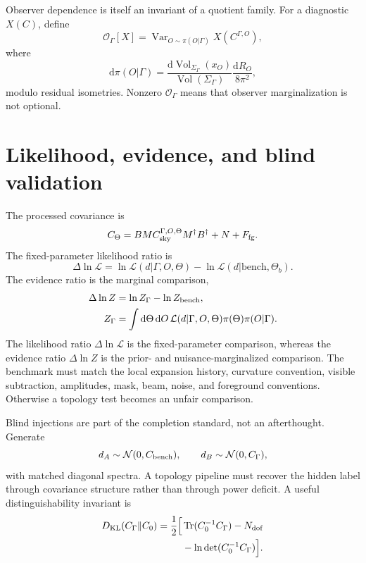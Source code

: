 \documentclass[
  aps,
  prd,
  reprint,
  superscriptaddress,
  floatfix,
  nofootinbib,
  longbibliography
]{revtex4-2}
\theoremstyle{plain}
\theoremstyle{definition}
\theoremstyle{remark}
\newcommand{\dd}{\mathrm d}
\newcommand{\Vol}{\operatorname{Vol}}
\newcommand{\Tr}{\operatorname{Tr}}
\newcommand{\KL}{\operatorname{KL}}
\newcommand{\Ocal}{\mathcal O}
\newcommand{\Lcal}{\mathcal L}
\begin{document}
Observer dependence is itself an invariant of a quotient family.  For a diagnostic $X(C)$, define
\begin{equation}
\Ocal_\Gamma[X]=\operatorname{Var}_{O\sim\pi(O|\Gamma)}X(C^{\Gamma,O}),
\label{eq:observer_dependence}
\end{equation}
where
\begin{equation}
\dd\pi(O|\Gamma)=
\frac{\dd\Vol_{\Sigma_\Gamma}(x_O)}{\Vol(\Sigma_\Gamma)}
\frac{\dd R_O}{8\pi^2},
\end{equation}
modulo residual isometries.  Nonzero $\Ocal_\Gamma$ means that observer marginalization is not optional.

\section{Likelihood, evidence, and blind validation}

The processed covariance is
\begin{equation}
C_\Theta=BMC_{\rm sky}^{\Gamma,O,\Theta}M^\dagger B^\dagger+N+F_{\rm fg}.
\label{eq:processed_covariance}
\end{equation}
The fixed-parameter likelihood ratio is
\begin{equation}
\Delta\ln\Lcal=
\ln\Lcal(d|\Gamma,O,\Theta)-\ln\Lcal(d|\mathrm{bench},\Theta_b).
\label{eq:likelihood_ratio}
\end{equation}
The evidence ratio is the marginal comparison,
\begin{align}
\Delta\ln Z&=\ln Z_\Gamma-\ln Z_{\rm bench},\nonumber\\
Z_\Gamma&=\int\dd\Theta\,\dd O\,
\Lcal(d|\Gamma,O,\Theta)\pi(\Theta)\pi(O|\Gamma).
\label{eq:evidence_ratio}
\end{align}
The likelihood ratio $\Delta\ln\Lcal$ is the fixed-parameter comparison, whereas the evidence ratio $\Delta\ln Z$ is the prior- and nuisance-marginalized comparison.  The benchmark must match the local expansion history, curvature convention, visible subtraction, amplitudes, mask, beam, noise, and foreground conventions.  Otherwise a topology test becomes an unfair comparison.

Blind injections are part of the completion standard, not an afterthought.  Generate
\begin{equation}
d_A\sim\mathcal N(0,C_{\rm bench}),
\qquad
d_B\sim\mathcal N(0,C_\Gamma),
\end{equation}
with matched diagonal spectra.  A topology pipeline must recover the hidden label through covariance structure rather than through power deficit.  A useful distinguishability invariant is
\begin{equation}
\begin{aligned}
D_{\KL}(C_\Gamma\|C_0)=\frac12\Big[&
\Tr(C_0^{-1}C_\Gamma)-N_{\rm dof}\\
&-\ln\det(C_0^{-1}C_\Gamma)\Big].
\end{aligned}
\label{eq:DKL}
\end{equation}
\end{document}
